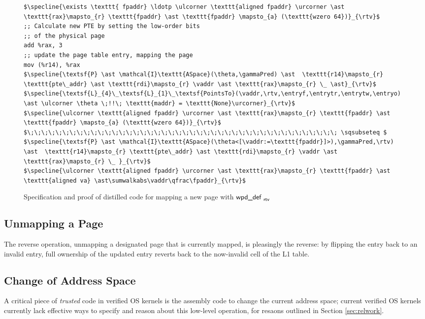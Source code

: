\begin{figure}
\begin{lstlisting}
$\specline{\exists \texttt{ fpaddr} \ldotp \ulcorner \texttt{aligned fpaddr} \urcorner \ast \texttt{rax}\mapsto_{r} \texttt{fpaddr} \ast \texttt{fpaddr} \mapsto_{a} (\texttt{wzero 64})}_{\rtv}$
;; Calculate new PTE by setting the low-order bits
;; of the physical page
add %rax, 3
;; update the page table entry, mapping the page
mov (%r14), %rax
$\specline{\textsf{P} \ast \mathcal{I}\texttt{ASpace}(\theta,\gammaPred) \ast  \texttt{r14}\mapsto_{r} \texttt{pte\_addr} \ast \texttt{rdi}\mapsto_{r} \vaddr \ast \texttt{rax}\mapsto_{r} \_ \ast}_{\rtv}$
$\specline{\textsf{L}_{4}\_\textsf{L}_{1}\_\textsf{PointsTo}(\vaddr,\rtv,\entryf,\entrytr,\entrytw,\entryo) \ast \ulcorner \theta \;!!\; \texttt{maddr} = \texttt{None}\urcorner}_{\rtv}$
$\specline{\ulcorner \texttt{aligned fpaddr} \urcorner \ast \texttt{rax}\mapsto_{r} \texttt{fpaddr} \ast \texttt{fpaddr} \mapsto_{a} (\texttt{wzero 64})}_{\rtv}$
$\;\;\;\;\;\;\;\;\;\;\;\;\;\;\;\;\;\;\;\;\;\;\;\;\;\;\;\;\;\;\;\;\;\;\;\;\;\;\;\;\;\;\;\; \sqsubseteq $
$\specline{\textsf{P} \ast \mathcal{I}\texttt{ASpace}(\theta<[\vaddr:=\texttt{fpaddr}]>),\gammaPred,\rtv) \ast  \texttt{r14}\mapsto_{r} \texttt{pte\_addr} \ast \texttt{rdi}\mapsto_{r} \vaddr \ast \texttt{rax}\mapsto_{r} \_ }_{\rtv}$
$\specline{\ulcorner \texttt{aligned fpaddr} \urcorner \ast \texttt{rax}\mapsto_{r} \texttt{fpaddr} \ast \texttt{aligned va} \ast\sumwalkabs\vaddr\qfrac\fpaddr}_{\rtv}$
\end{lstlisting}
  \caption{Specification and proof of distilled code for mapping a new page with $\textsf{wpd\_def }_{\textsf{rtv}}$}
\label{fig:mapping_code}
\end{figure}


\subsection{Unmapping a Page}
The reverse operation, unmapping a designated page that is currently mapped, is pleasingly the reverse: by flipping the entry back to an invalid entry, full ownership of the updated entry reverts back to the now-invalid cell of the L1 table.

\subsection{Change of Address Space}
A critical piece of \emph{trusted} code in verified OS kernels is the assembly code to change the current address space; current verified OS kernels currently lack effective ways to specify and reason about this low-level operation, for resaons outlined in Section \ref{sec:relwork}.

